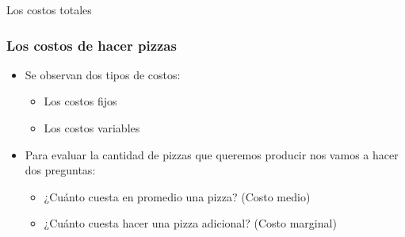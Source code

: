\documentclass{beamer}
\begin{document}
\begin{frame}{Los costos totales}
    \begin{center}
    \end{center}
\end{frame}

\begin{frame}
\frametitle{Los costos de hacer pizzas}
\begin{itemize}
    \item Se observan dos tipos de costos: 
        \begin{itemize}
        \item Los costos fijos
        \item Los costos variables
        \end{itemize}
    \vspace{2mm}
    \item Para evaluar la cantidad de pizzas que queremos producir nos vamos a hacer dos preguntas:
        \begin{itemize}
        \item ¿Cuánto cuesta en promedio una pizza? (Costo medio)
        \item ¿Cuánto cuesta hacer una pizza adicional? (Costo marginal)
        \end{itemize}
\end{itemize}
\end{frame}
\end{document}
